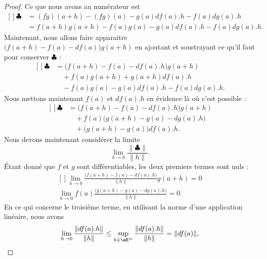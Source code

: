 \begin{proof}
	Ce que nous avons au numérateur est
	\begin{equation}
		\begin{aligned}[]
			\clubsuit & =(fg)(a+h)-(fg)(a)-g(a)df(a).h-f(a)dg(a).h      \\
			          & =f(a+h)g(a+h)-f(a)g(a)-g(a)df(a).h-f(a)dg(a).h.
		\end{aligned}
	\end{equation}
	Maintenant, nous allons faire apparaitre \( \big( f(a+h)-f(a)-df(a) \big)g(a+h)\) en ajoutant et soustrayant ce qu'il faut pour conserver \( \clubsuit\) :
	\begin{equation}
		\begin{aligned}[]
			\clubsuit & =\big( f(a+h)-f(a)-df(a).h \big)g(a+h)   \\
			          & \quad +f(a)g(a+h)+g(a+h)df(a).h          \\
			          & \quad -f(a)g(a)-g(a)df(a).h-f(a)dg(a).h.
		\end{aligned}
	\end{equation}
	Nous mettons maintenant \( f(a)\) et \( df(a).h\) en évidence là où c'est possible :
	\begin{equation}
		\begin{aligned}[]
			\clubsuit & =\big( f(a+h)-f(a)-df(a).h \big)g(a+h)    \\
			          & \quad+f(a)\big( g(a+h)-g(a)-dg(a).h \big) \\
			          & \quad+\big( g(a+h)-g(a) \big)df(a).h.
		\end{aligned}
	\end{equation}
	Nous devons maintenant considérer la limite
	\begin{equation}
		\lim_{h\to 0}\frac{ \| \clubsuit \| }{ \| h \| }.
	\end{equation}
	Étant donné que \( f\) et \( g\) sont différentiables, les deux premiers termes sont nuls :
	\begin{equation}
		\begin{aligned}[]
			\lim_{h\to 0}\frac{ \big( f(a+h)-f(a)-df(a).h \big)}{\| h \|}g(a+h)=0 \\
			\lim_{h\to 0} f(a)\frac{ \big( g(a+h)-g(a)-dg(a).h \big)}{\| h \|}=0.
		\end{aligned}
	\end{equation}
	En ce qui concerne le troisième terme, en utilisant la norme d'une application linéaire, nous avons
	\begin{equation}
		\lim_{h\to 0} \frac{ \| df(a).h \| }{ \| h \| }\leq\sup_{h\in\eR^m}\frac{ \| df(a).h \| }{ \| h \| }=\| df(a) \|,

\end{equation}
\end{proof}
